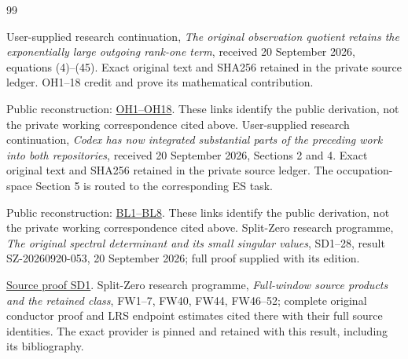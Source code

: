 \documentclass[11pt]{article}
\begin{document}
\clearpage
\begin{thebibliography}{99}

 User-supplied research continuation,
\emph{The original observation quotient retains the exponentially large
outgoing rank-one term}, received 20 September 2026, equations (4)--(45).
Exact original text and SHA256 retained in the private source ledger.
OH1--18 credit and prove its mathematical contribution.

Public reconstruction: \href{https://github.com/KokunoYumeto/zeta-function-research-reader/blob/689a8f87e9c12b7a99b01b3123438c6751ee608f/workbenches/splitzero-tandem/continuations/20260921-kernel-degree-steps/providers/OBSERVATION_COMPLETE_PROOFS.tex\#L203}{OH1--OH18}. These links identify the public derivation, not the private working correspondence cited above.
 User-supplied research continuation,
\emph{Codex has now integrated substantial parts of the preceding work
into both repositories}, received 20 September 2026, Sections 2 and 4.
Exact original text and SHA256 retained in the private source ledger.
The occupation-space Section 5 is routed to the corresponding ES task.

Public reconstruction: \href{https://github.com/KokunoYumeto/zeta-function-research-reader/blob/689a8f87e9c12b7a99b01b3123438c6751ee608f/workbenches/splitzero-tandem/continuations/20260921-kernel-degree-steps/providers/OBSERVATION_COMPLETE_PROOFS.tex\#L499}{BL1--BL8}. These links identify the public derivation, not the private working correspondence cited above.
 Split-Zero research programme, \emph{The original spectral
determinant and its small singular values}, SD1--28, result
SZ-20260920-053, 20 September 2026; full proof supplied with its edition.

\href{https://github.com/KokunoYumeto/zeta-function-research-reader/blob/5992ad50c0f2a06921f1fcaded7b4e38097c0739/workbenches/splitzero-tandem/continuations/20260920-original-kernel-mixed-determinants/providers/ORIGINAL_SPECTRAL_DETERMINANT.tex\#L34}{Source proof SD1}.
 Split-Zero research programme, \emph{Full-window source
products and the retained class}, FW1--7, FW40, FW44, FW46--52;
complete original conductor proof and LRS endpoint estimates cited
there with their full source identities. The exact provider is pinned
and retained with this result, including its bibliography.


\end{thebibliography}
\end{document}
